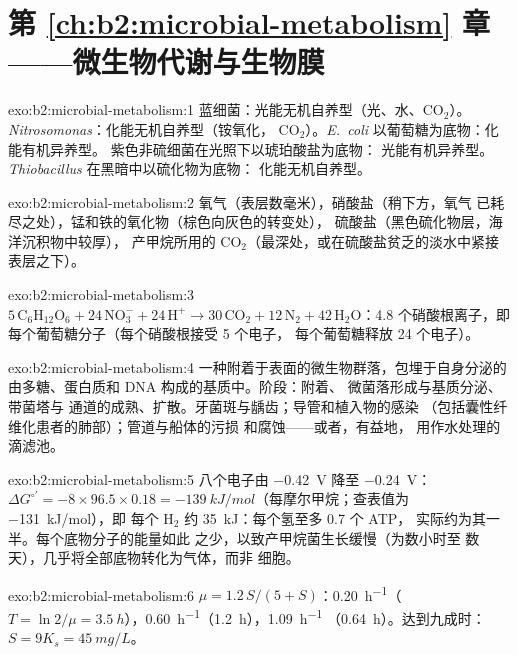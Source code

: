 \section*{第 \ref{ch:b2:microbial-metabolism} 章——微生物代谢与生物膜}

\begin{solution}{exo:b2:microbial-metabolism:1}
蓝细菌：光能无机自养型（光、水、$\mathrm{CO_2}$）。
\emph{Nitrosomonas}：化能无机自养型（铵氧化，
$\mathrm{CO_2}$）。\emph{E.~coli} 以葡萄糖为底物：化能有机异养型。
紫色非硫细菌在光照下以琥珀酸盐为底物：
光能有机异养型。\emph{Thiobacillus} 在黑暗中以硫化物为底物：
化能无机自养型。
\end{solution}

\begin{solution}{exo:b2:microbial-metabolism:2}
氧气（表层数毫米），硝酸盐（稍下方，氧气
已耗尽之处），锰和铁的氧化物（棕色向灰色的转变处），
硫酸盐（黑色硫化物层，海洋沉积物中较厚），
产甲烷所用的 $\mathrm{CO_2}$（最深处，或在硫酸盐贫乏的淡水中紧接
表层之下）。
\end{solution}

\begin{solution}{exo:b2:microbial-metabolism:3}
$5\,\mathrm{C_6H_{12}O_6} + 24\,\mathrm{NO_3^-} + 24\,\mathrm{H^+}
\to 30\,\mathrm{CO_2} + 12\,\mathrm{N_2} + 42\,\mathrm{H_2O}$：4.8
个硝酸根离子，即每个葡萄糖分子（每个硝酸根接受 5 个电子，
每个葡萄糖释放 24 个电子）。
\end{solution}

\begin{solution}{exo:b2:microbial-metabolism:4}
一种附着于表面的微生物群落，包埋于自身分泌的
由多糖、蛋白质和 DNA 构成的基质中。阶段：附着、
微菌落形成与基质分泌、带菌塔与
通道的成熟、扩散。牙菌斑与龋齿；导管和植入物的感染
（包括囊性纤维化患者的肺部）；管道与船体的污损
和腐蚀——或者，有益地，
用作水处理的滴滤池。
\end{solution}

\begin{solution}{exo:b2:microbial-metabolism:5}
八个电子由 \qty{-0.42}{V} 降至 \qty{-0.24}{V}：
$\Delta G^{\circ\prime} = -8\times 96.5\times 0.18 =
\qty{-139}{kJ/mol}$（每摩尔甲烷；查表值为 \qty{-131}{kJ/mol}），即
每个 $\mathrm{H_2}$ 约 \qty{35}{kJ}：每个氢至多 0.7 个 ATP，
实际约为其一半。每个底物分子的能量如此
之少，以致产甲烷菌生长缓慢（为数小时至
数天），几乎将全部底物转化为气体，而非
细胞。
\end{solution}

\begin{solution}{exo:b2:microbial-metabolism:6}
$\mu = 1.2\,S/(5 + S)$：\qty{0.20}{h^{-1}}（$T = \ln 2/\mu =
\qty{3.5}{h}$），\qty{0.60}{h^{-1}}（\qty{1.2}{h}），\qty{1.09}{h^{-1}}
（\qty{0.64}{h}）。达到九成时：$S = 9K_s = \qty{45}{mg/L}$。
\end{solution}

